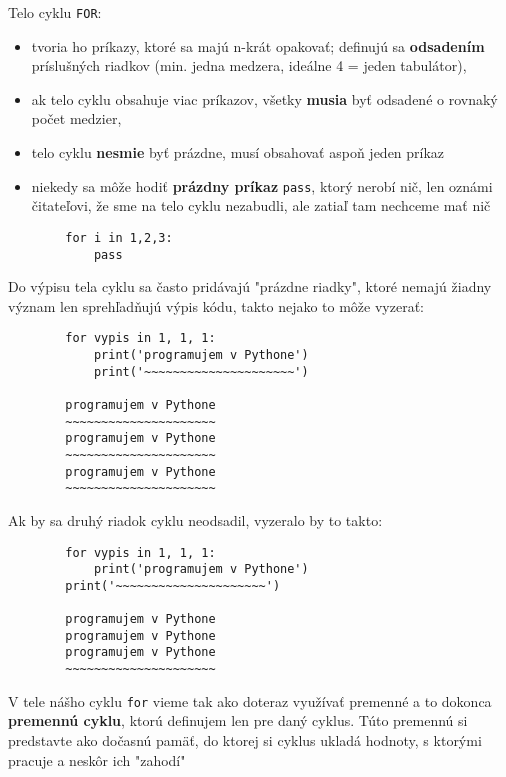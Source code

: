\documentclass[a4paper,11pt]{report}
\begin{document}
	\noindent Telo cyklu \texttt{FOR}:
	\begin{itemize}
		\item tvoria ho príkazy, ktoré sa majú n-krát opakovať; definujú sa \textbf{odsadením} príslušných riadkov (min. jedna medzera, ideálne 4 = jeden tabulátor),
		
		\item ak telo cyklu obsahuje viac príkazov, všetky \textbf{musia} byť odsadené o rovnaký počet medzier,
		
		\item telo cyklu \textbf{nesmie} byť prázdne, musí obsahovať aspoň jeden príkaz
		
		\item niekedy sa môže hodiť \textbf{prázdny príkaz} \texttt{pass}, ktorý nerobí nič, len oznámi čitateľovi, že sme na telo cyklu
		nezabudli, ale zatiaľ tam nechceme mať nič
		
	\end{itemize}
	
	\begin{verbatim}
		for i in 1,2,3:
		    pass
	\end{verbatim}
	
	\noindent Do výpisu tela cyklu sa často pridávajú "prázdne riadky", ktoré nemajú žiadny význam len sprehľadňujú výpis kódu, takto nejako to môže vyzerať: 
	
	\begin{verbatim}
		for vypis in 1, 1, 1:
		    print('programujem v Pythone')
		    print('~~~~~~~~~~~~~~~~~~~~~')
		
		programujem v Pythone
		~~~~~~~~~~~~~~~~~~~~~
		programujem v Pythone
		~~~~~~~~~~~~~~~~~~~~~
		programujem v Pythone
		~~~~~~~~~~~~~~~~~~~~~
	\end{verbatim}
	
	\noindent Ak by sa druhý riadok cyklu neodsadil, vyzeralo by to takto: 
	
	\begin{verbatim}
		for vypis in 1, 1, 1:
		    print('programujem v Pythone')
		print('~~~~~~~~~~~~~~~~~~~~~')
		
		programujem v Pythone
		programujem v Pythone
		programujem v Pythone
		~~~~~~~~~~~~~~~~~~~~~
	\end{verbatim}
	
	\noindent V tele nášho cyklu \texttt{for} vieme tak ako doteraz využívať premenné a to dokonca \textbf{premennú cyklu}, ktorú definujem len pre daný cyklus. Túto premennú si predstavte ako dočasnú pamäť, do ktorej si cyklus ukladá hodnoty, s ktorými pracuje a neskôr ich "zahodí"
	
\end{document}
